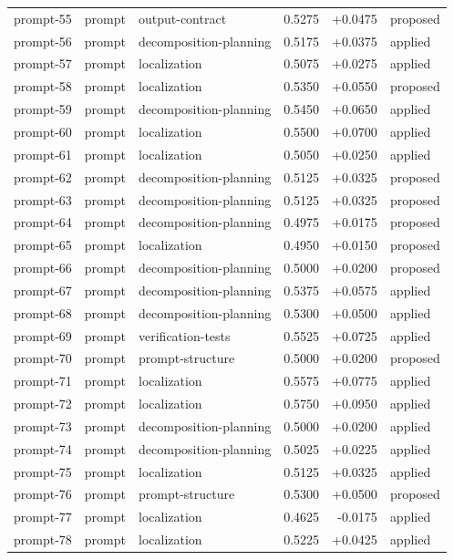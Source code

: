 \begin{center}
\begin{longtable}{llp{5.2cm}rrl}
prompt-55 & prompt & output-contract & 0.5275 & +0.0475 & proposed \\
prompt-56 & prompt & decomposition-planning & 0.5175 & +0.0375 & applied \\
prompt-57 & prompt & localization & 0.5075 & +0.0275 & applied \\
prompt-58 & prompt & localization & 0.5350 & +0.0550 & proposed \\
prompt-59 & prompt & decomposition-planning & 0.5450 & +0.0650 & applied \\
prompt-60 & prompt & localization & 0.5500 & +0.0700 & applied \\
prompt-61 & prompt & localization & 0.5050 & +0.0250 & applied \\
prompt-62 & prompt & decomposition-planning & 0.5125 & +0.0325 & proposed \\
prompt-63 & prompt & decomposition-planning & 0.5125 & +0.0325 & proposed \\
prompt-64 & prompt & decomposition-planning & 0.4975 & +0.0175 & proposed \\
prompt-65 & prompt & localization & 0.4950 & +0.0150 & proposed \\
prompt-66 & prompt & decomposition-planning & 0.5000 & +0.0200 & proposed \\
prompt-67 & prompt & decomposition-planning & 0.5375 & +0.0575 & applied \\
prompt-68 & prompt & decomposition-planning & 0.5300 & +0.0500 & applied \\
prompt-69 & prompt & verification-tests & 0.5525 & +0.0725 & applied \\
prompt-70 & prompt & prompt-structure & 0.5000 & +0.0200 & proposed \\
prompt-71 & prompt & localization & 0.5575 & +0.0775 & applied \\
prompt-72 & prompt & localization & 0.5750 & +0.0950 & applied \\
prompt-73 & prompt & decomposition-planning & 0.5000 & +0.0200 & applied \\
prompt-74 & prompt & decomposition-planning & 0.5025 & +0.0225 & applied \\
prompt-75 & prompt & localization & 0.5125 & +0.0325 & applied \\
prompt-76 & prompt & prompt-structure & 0.5300 & +0.0500 & proposed \\
prompt-77 & prompt & localization & 0.4625 & -0.0175 & applied \\
prompt-78 & prompt & localization & 0.5225 & +0.0425 & applied \\

\end{longtable}
\end{center}
